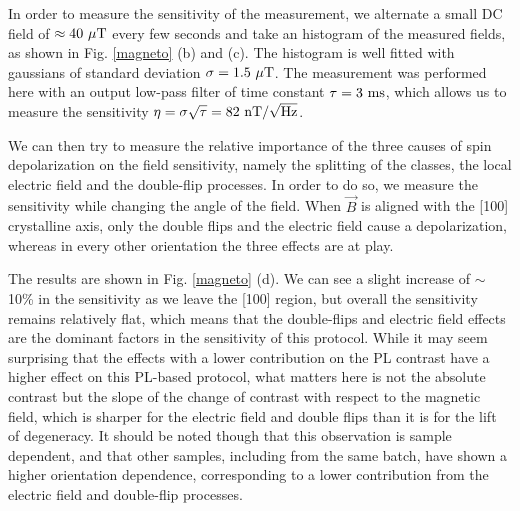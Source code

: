 \documentclass[preprintnumbers,amsmath,amssymb,superscriptaddress,twocolumn,showpacs]{revtex4-2}
\begin{document}
In order to measure the sensitivity of the measurement, we alternate a small DC field of $\approx 40\ \mu\rm{T}$ every few seconds and take an histogram of the measured fields, as shown in Fig. \ref{magneto} (b) and (c). The histogram is well fitted with gaussians of standard deviation $\sigma=1.5\ \mu \rm T$. The measurement was performed here with an output low-pass filter of time constant $\tau=3\ \rm ms$, which allows us to measure the sensitivity $\eta=\sigma \sqrt{\tau}=82\ \rm{nT}/\sqrt{\rm Hz}$.

We can then try to measure the relative importance of the three causes of spin depolarization on the field sensitivity, namely the splitting of the classes, the local electric field and the double-flip processes. In order to do so, we measure the sensitivity while changing the angle of the field. When $\vec B$ is aligned with the [100] crystalline axis, only the double flips and the electric field cause a depolarization, whereas in every other orientation the three effects are at play.

The results are shown in Fig. \ref{magneto} (d). We can see a slight increase of $\sim$ 10\% in the sensitivity as we leave the [100] region, but overall the sensitivity remains relatively flat, which means that the double-flips and electric field effects are the dominant factors in the sensitivity of this protocol. While it may seem surprising that the effects with a lower contribution on the PL contrast have a higher effect on this PL-based protocol, what matters here is not the absolute contrast but the slope of the change of contrast with respect to the magnetic field, which is sharper for the electric field and double flips than it is for the lift of degeneracy. %
It should be noted though that this observation is sample dependent, and that other samples, including from the same batch, have shown a higher orientation dependence, corresponding to a lower contribution from the electric field and double-flip processes.
\end{document}
